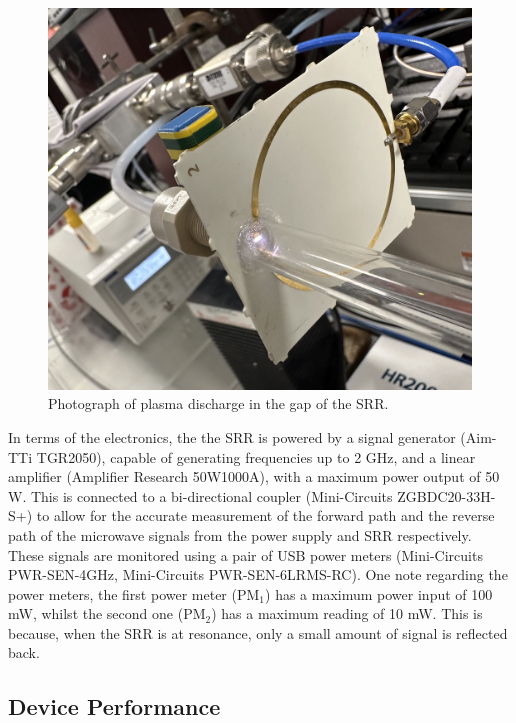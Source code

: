 \begin{figure}[h!]
	\centering
	\includegraphics[width=0.55\linewidth]{chapter_4/figures/plasma.jpeg}
	\caption{Photograph of plasma discharge in the gap of the SRR.}
	\label{fig:SRR_plasma}
\end{figure}


In terms of the electronics, the the SRR is powered by a signal generator (Aim-TTi TGR2050), capable of generating frequencies up to 2 GHz, and a linear amplifier (Amplifier Research 50W1000A), with a maximum power output of 50 W. This is connected to a bi-directional coupler (Mini-Circuits ZGBDC20-33H-S+) to allow for the accurate measurement of the forward path and the reverse path of the microwave signals from the power supply and SRR respectively. These signals are monitored using a pair of USB power meters (Mini-Circuits PWR-SEN-4GHz, Mini-Circuits PWR-SEN-6LRMS-RC). One note regarding the power meters, the first power meter (PM$_1$) has a maximum power input of 100 mW, whilst the second one (PM$_2$) has a maximum reading of 10 mW. This is because, when the SRR is at resonance, only a small amount of signal is reflected back. 

\subsection{Device Performance}

